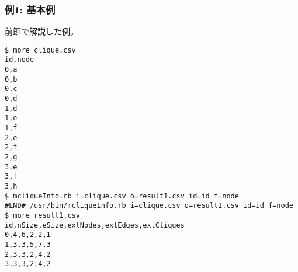 \subsubsection*{例1: 基本例}

前節で解説した例。


\begin{Verbatim}[baselinestretch=0.7,frame=single]
$ more clique.csv
id,node
0,a
0,b
0,c
0,d
1,d
1,e
1,f
2,e
2,f
2,g
3,e
3,f
3,h
$ mcliqueInfo.rb i=clique.csv o=result1.csv id=id f=node
#END# /usr/bin/mcliqueInfo.rb i=clique.csv o=result1.csv id=id f=node
$ more result1.csv
id,nSize,eSize,extNodes,extEdges,extCliques
0,4,6,2,2,1
1,3,3,5,7,3
2,3,3,2,4,2
3,3,3,2,4,2
\end{Verbatim}

